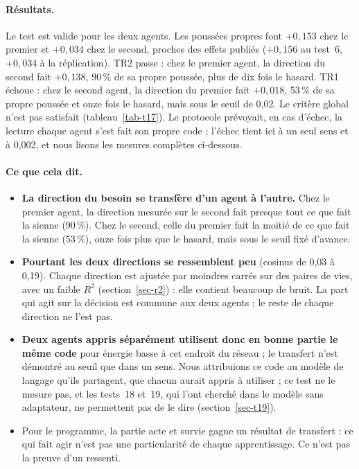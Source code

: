 \documentclass[11pt,a4paper]{article}
\begin{document}
\paragraph{Résultats.} Le test est valide pour les deux agents. Les poussées propres
font $+0,153$ chez le premier et $+0,034$ chez le second, proches des effets publiés
($+0,156$ au test~6, $+0,034$ à la réplication). TR2
passe : chez le premier agent, la direction du second fait $+0,138$, 90\,\% de sa propre
poussée, plus de dix fois le hasard. TR1 échoue : chez le second agent, la direction du
premier fait $+0,018$, 53\,\% de sa propre poussée et onze fois le hasard, mais sous le
seuil de 0,02. Le critère global n'est pas satisfait (tableau~\ref{tab-t17}). Le protocole
prévoyait, en cas d'échec, la lecture \og chaque agent s'est fait son propre code \fg{} ;
l'échec tient ici à un seul sens et à 0,002, et nous lisons les mesures complètes
ci-dessous.

\paragraph{Ce que cela dit.}
\begin{itemize}
\item \textbf{La direction du besoin se transfère d'un agent à l'autre.} Chez le premier
agent, la direction mesurée sur le second fait presque tout ce que fait la sienne
(90\,\%). Chez le second, celle du premier fait la moitié de ce que fait la sienne
(53\,\%), onze fois plus que le hasard, mais sous le seuil fixé d'avance.
\item \textbf{Pourtant les deux directions se ressemblent peu} (cosinus de 0,03 à 0,19).
Chaque direction est ajustée par moindres carrés sur des paires de vies, avec un faible
$R^2$ (section~\ref{sec-r2}) : elle contient beaucoup de bruit. La part qui agit sur la
décision est commune aux deux agents ; le reste de chaque direction ne l'est pas.
\item \textbf{Deux agents appris séparément utilisent donc en bonne partie le même code}
pour \og énergie basse \fg{} à cet endroit du réseau ; le transfert n'est démontré au seuil
que dans un sens. Nous attribuions ce code au modèle de langage qu'ils partagent, que chacun
aurait appris à utiliser ; ce test ne le mesure pas, et les tests~18 et~19, qui l'ont cherché
dans le modèle sans adaptateur, ne permettent pas de le dire (section~\ref{sec-t19}).
\item Pour le programme, la partie acte et survie gagne un résultat de transfert : ce qui
fait agir n'est pas une particularité de chaque apprentissage. Ce n'est pas la preuve
d'un ressenti.
\end{itemize}
\end{document}
